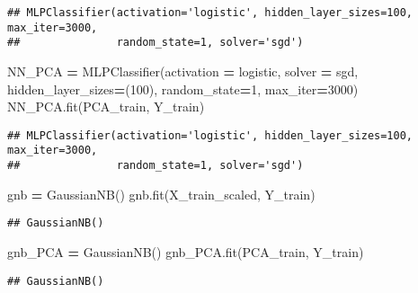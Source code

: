 \documentclass[
]{article}
\newenvironment{Shaded}{\begin{snugshade}}{\end{snugshade}}
\newcommand{\DecValTok}[1]{\textcolor[rgb]{0.00,0.00,0.81}{#1}}
\newcommand{\NormalTok}[1]{#1}
\newcommand{\OperatorTok}[1]{\textcolor[rgb]{0.81,0.36,0.00}{\textbf{#1}}}
\newcommand{\StringTok}[1]{\textcolor[rgb]{0.31,0.60,0.02}{#1}}
\begin{document}
\begin{verbatim}
## MLPClassifier(activation='logistic', hidden_layer_sizes=100, max_iter=3000,
##               random_state=1, solver='sgd')
\end{verbatim}

\begin{Shaded}
\begin{Highlighting}[]
\NormalTok{NN\_PCA }\OperatorTok{=}\NormalTok{ MLPClassifier(activation }\OperatorTok{=} \StringTok{\textquotesingle{}logistic\textquotesingle{}}\NormalTok{, solver }\OperatorTok{=} \StringTok{\textquotesingle{}sgd\textquotesingle{}}\NormalTok{, hidden\_layer\_sizes}\OperatorTok{=}\NormalTok{(}\DecValTok{100}\NormalTok{), random\_state}\OperatorTok{=}\DecValTok{1}\NormalTok{, max\_iter}\OperatorTok{=}\DecValTok{3000}\NormalTok{)}
\NormalTok{NN\_PCA.fit(PCA\_train, Y\_train)}
\end{Highlighting}
\end{Shaded}

\begin{verbatim}
## MLPClassifier(activation='logistic', hidden_layer_sizes=100, max_iter=3000,
##               random_state=1, solver='sgd')
\end{verbatim}

\begin{Shaded}
\begin{Highlighting}[]
\NormalTok{gnb }\OperatorTok{=}\NormalTok{ GaussianNB()}
\NormalTok{gnb.fit(X\_train\_scaled, Y\_train)}
\end{Highlighting}
\end{Shaded}

\begin{verbatim}
## GaussianNB()
\end{verbatim}

\begin{Shaded}
\begin{Highlighting}[]
\NormalTok{gnb\_PCA }\OperatorTok{=}\NormalTok{ GaussianNB()}
\NormalTok{gnb\_PCA.fit(PCA\_train, Y\_train)}
\end{Highlighting}
\end{Shaded}

\begin{verbatim}
## GaussianNB()
\end{verbatim}
\end{document}
